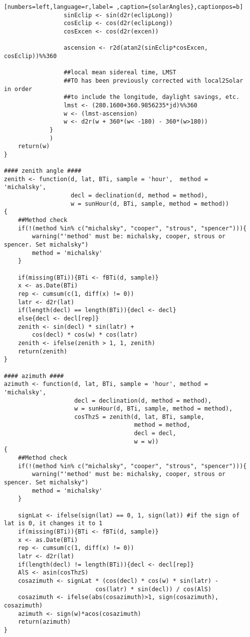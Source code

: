 \begin{lstlisting}[numbers=left,language=r,label= ,caption={solarAngles},captionpos=b]
                 sinEclip <- sin(d2r(eclipLong))
                 cosEclip <- cos(d2r(eclipLong))
                 cosExcen <- cos(d2r(excen))

                 ascension <- r2d(atan2(sinEclip*cosExcen, cosEclip))%%360

                 ##local mean sidereal time, LMST
                 ##TO has been previously corrected with local2Solar in order
                 ##to include the longitude, daylight savings, etc.
                 lmst <- (280.1600+360.9856235*jd)%%360
                 w <- (lmst-ascension)
                 w <- d2r(w + 360*(w< -180) - 360*(w>180))
             }
             )
    return(w)
}

#### zenith angle ####
zenith <- function(d, lat, BTi, sample = 'hour',  method = 'michalsky',
                   decl = declination(d, method = method),
                   w = sunHour(d, BTi, sample, method = method))
{
    ##Method check
    if(!(method %in% c("michalsky", "cooper", "strous", "spencer"))){
        warning("'method' must be: michalsky, cooper, strous or spencer. Set michalsky")
        method = 'michalsky'
    }

    if(missing(BTi)){BTi <- fBTi(d, sample)}
    x <- as.Date(BTi)
    rep <- cumsum(c(1, diff(x) != 0))
    latr <- d2r(lat)
    if(length(decl) == length(BTi)){decl <- decl}
    else{decl <- decl[rep]}
    zenith <- sin(decl) * sin(latr) +
        cos(decl) * cos(w) * cos(latr)
    zenith <- ifelse(zenith > 1, 1, zenith)
    return(zenith)
}

#### azimuth ####
azimuth <- function(d, lat, BTi, sample = 'hour', method = 'michalsky',
                    decl = declination(d, method = method),
                    w = sunHour(d, BTi, sample, method = method),
                    cosThzS = zenith(d, lat, BTi, sample,
                                     method = method,
                                     decl = decl,
                                     w = w))
{
    ##Method check
    if(!(method %in% c("michalsky", "cooper", "strous", "spencer"))){
        warning("'method' must be: michalsky, cooper, strous or spencer. Set michalsky")
        method = 'michalsky'
    }

    signLat <- ifelse(sign(lat) == 0, 1, sign(lat)) #if the sign of lat is 0, it changes it to 1
    if(missing(BTi)){BTi <- fBTi(d, sample)}
    x <- as.Date(BTi)
    rep <- cumsum(c(1, diff(x) != 0))
    latr <- d2r(lat)
    if(length(decl) != length(BTi)){decl <- decl[rep]}
    AlS <- asin(cosThzS)
    cosazimuth <- signLat * (cos(decl) * cos(w) * sin(latr) -
                          cos(latr) * sin(decl)) / cos(AlS)
    cosazimuth <- ifelse(abs(cosazimuth)>1, sign(cosazimuth), cosazimuth)
    azimuth <- sign(w)*acos(cosazimuth)
    return(azimuth)
}
\end{lstlisting}
